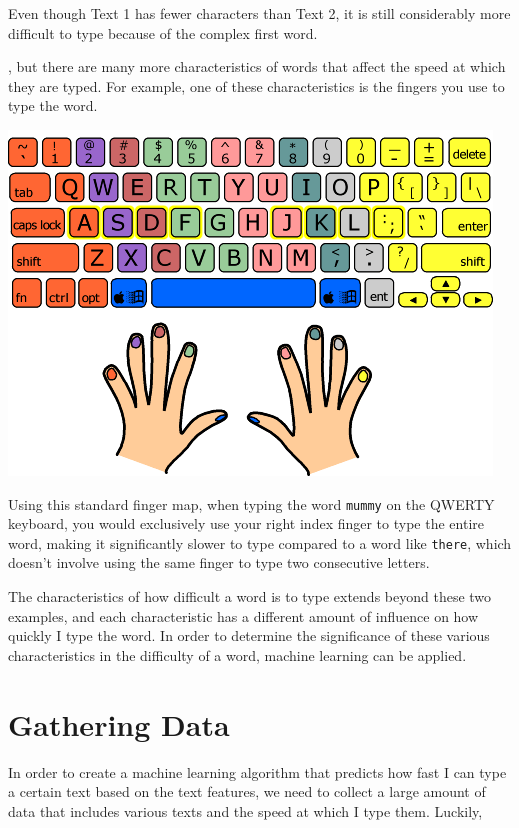 \documentclass[12pt]{article}
\newenvironment{textexamples}
  {\medskip\par\setlength{\parindent}{0pt}}
  {\par\medskip}
\begin{document}
Even though Text 1 has fewer characters than Text 2, it is still considerably more difficult to type because of the complex first word.

, but there are many more characteristics of words that affect the speed at which they are typed. For example, one of these characteristics is the fingers you use to type the word.

\includegraphics{finger-map.png}

Using this standard finger map, when typing the word \texttt{mummy} on the QWERTY keyboard, you would exclusively use your right index finger to type the entire word, making it significantly slower to type compared to a word like \texttt{there}, which doesn't involve using the same finger to type two consecutive letters.

\begin{textexamples}
\end{textexamples}

The characteristics of how difficult a word is to type extends beyond these two examples, and each characteristic has a different amount of influence on how quickly I type the word. In order to determine the significance of these various characteristics in the difficulty of a word, machine learning can be applied.

\section{Gathering Data}

In order to create a machine learning algorithm that predicts how fast I can type a certain text based on the text features, we need to collect a large amount of data that includes various texts and the speed at which I type them. Luckily,
\end{document}
